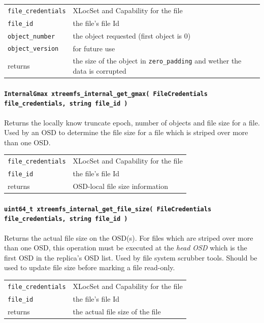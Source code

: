 \begin{tabularx}{\textwidth}{lX}
 \texttt{file\_credentials} & XLocSet and Capability for the file\\
 \texttt{file\_id} & the file's file Id\\
 \texttt{object\_number} & the object requested (first object is 0)\\
 \texttt{object\_version} & for future use\\
 returns & the size of the object in \texttt{zero\_padding} and wether the data is corrupted\\
\end{tabularx}


\paragraph{\texttt{InternalGmax xtreemfs\_internal\_get\_gmax( FileCredentials file\_credentials, string file\_id~)}}
Returns the locally know truncate epoch, number of objects and file size for a file. Used by an OSD to determine the file size for a file which is striped over more than one OSD.

\begin{tabularx}{\textwidth}{lX}
 \texttt{file\_credentials} & XLocSet and Capability for the file\\
 \texttt{file\_id} & the file's file Id\\
 returns & OSD-local file size information\\
\end{tabularx}



\paragraph{\texttt{uint64\_t xtreemfs\_internal\_get\_file\_size( FileCredentials file\_credentials, string file\_id~)}}
Returns the actual file size on the OSD(s). For files which are striped over more than one OSD, this operation must be executed at the \textit{head OSD} which is the first OSD in the replica's OSD list. Used by file system scrubber tools. Should be used to update file size before marking a file read-only.

\begin{tabularx}{\textwidth}{lX}
 \texttt{file\_credentials} & XLocSet and Capability for the file\\
 \texttt{file\_id} & the file's file Id\\
 returns & the actual file size of the file\\
\end{tabularx}



